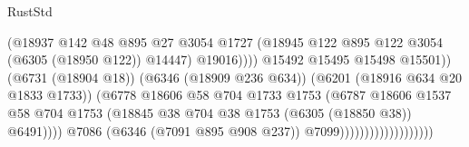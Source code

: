 \begin{lexlean}{RustStd}
\begin{coremodule}
                                                      (@18937
                                                        @142
                                                        @48
                                                        @895
                                                        @27
                                                        @3054
                                                        @1727
                                                        (@18945
                                                          @122
                                                          @895
                                                          @122
                                                          @3054
                                                          (@6305 (@18950 @122))
                                                          @14447)
                                                        @19016))))
                                                @15492
                                                @15495
                                                @15498
                                                @15501))
                                            (@6731 (@18904 @18))
                                            (@6346 (@18909 @236 @634))
                                            (@6201 (@18916 @634 @20 @1833 @1733))
                                            (@6778
                                              @18606
                                              @58
                                              @704
                                              @1733
                                              @1753
                                              (@6787
                                                @18606
                                                @1537
                                                @58
                                                @704
                                                @1753
                                                (@18845
                                                  @38
                                                  @704
                                                  @38
                                                  @1753
                                                  (@6305 (@18850 @38))
                                                  @6491))))
                                          @7086
                                          (@6346 (@7091 @895 @908 @237))
                                          @7099)))))))))))))))))))

\end{coremodule}
\end{lexlean}
